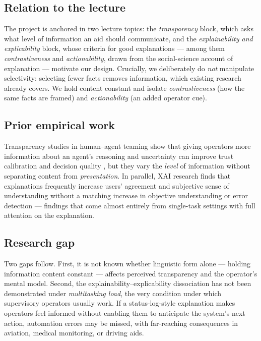 \documentclass[10pt,twocolumn]{article}
\begin{document}
\subsection{Relation to the lecture}
The project is anchored in two lecture topics: the \textit{transparency} block, which asks what level of information an aid should communicate, and the \textit{explainability and explicability} block, whose criteria for good explanations --- among them \textit{contrastiveness} and \textit{actionability}, drawn from the social-science account of explanation \parencite{Miller2019} --- motivate our design. Crucially, we deliberately do \textit{not} manipulate selectivity: selecting fewer facts removes information, which existing research already covers. We hold content constant and isolate \textit{contrastiveness} (how the same facts are framed) and \textit{actionability} (an added operator cue).

\subsection{Prior empirical work}
Transparency studies in human--agent teaming show that giving operators more information about an agent's reasoning and uncertainty can improve trust calibration and decision quality \parencite{Mercado2016,Stowers2017}, but they vary the \textit{level} of information without separating content from \textit{presentation}. In parallel, XAI research finds that explanations frequently increase users' agreement and subjective sense of understanding without a matching increase in objective understanding or error detection \parencite{Bansal2021,WangYin2021} --- findings that come almost entirely from single-task settings with full attention on the explanation.

\subsection{Research gap}
Two gaps follow. First, it is not known whether linguistic form alone --- holding information content constant --- affects perceived transparency and the operator's mental model. Second, the explainability--explicability dissociation has not been demonstrated under \textit{multitasking load}, the very condition under which supervisory operators usually work. If a status-log-style explanation makes operators feel informed without enabling them to anticipate the system's next action, automation errors may be missed, with far-reaching consequences in aviation, medical monitoring, or driving aids.
\end{document}
